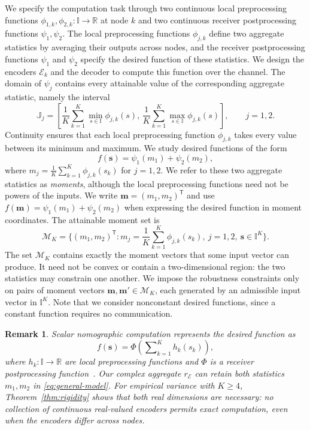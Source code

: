 \documentclass[journal,12pt,onecolumn,draftclsnofoot]{IEEEtran}
\newtheorem{remark}{Remark}
\newcommand{\enc}{\mathscr{E}}\newcommand{\dec}{\mathscr{D}}\newcommand{\R}{\mathbb R}\newcommand{\C}{\mathbb C}
\newcommand{\T}{\mathsf T}\newcommand{\suc}{\succeq}
\begin{document}
We specify the computation task through two continuous local preprocessing functions $\phi_{1,k},\phi_{2,k}:\mathbb I\to\R$ at node $k$ and two continuous receiver postprocessing functions $\psi_1,\psi_2$. The local preprocessing functions $\phi_{j,k}$ define two aggregate statistics by averaging their outputs across nodes, and the receiver postprocessing functions $\psi_1$ and $\psi_2$ specify the desired function of these statistics. We design the encoders $\mathscr E_k$ and the decoder to compute this function over the channel. The domain of $\psi_j$ contains every attainable value of the corresponding aggregate statistic, namely the interval
$$
\mathbb J_j=\left[
\frac1K\sum_{k=1}^K\min_{s\in\mathbb I}\phi_{j,k}(s),\,
\frac1K\sum_{k=1}^K\max_{s\in\mathbb I}\phi_{j,k}(s)
\right],\qquad j=1,2.
$$
Continuity ensures that each local preprocessing function $\phi_{j,k}$ takes every value between its minimum and maximum. We study desired functions of the form
\begin{equation}
 f(\boldsymbol s)=\psi_1(m_1)+\psi_2(m_2),
 \label{eq:general-model}
\end{equation}
where $m_j=\frac1K\sum_{k=1}^K\phi_{j,k}(s_k)$ for $j=1,2$. We refer to these two aggregate statistics as \emph{moments}, although the local preprocessing functions need not be powers of the inputs. We write $\boldsymbol m=(m_1,m_2)^\T$ and use $f(\boldsymbol m)=\psi_1(m_1)+\psi_2(m_2)$ when expressing the desired function in moment coordinates. The attainable moment set is
\begin{equation}
 \mathcal M_K=\bigg\{(m_1,m_2)^\T: m_j=\frac1K\sum_{k=1}^K\phi_{j,k}(s_k),~ j=1,2,~ \boldsymbol s\in\mathbb I^K\bigg\}.
 \label{eq:general-moment-set}
\end{equation}
The set $\mathcal M_K$ contains exactly the moment vectors that some input vector can produce. It need not be convex or contain a two-dimensional region: the two statistics may constrain one another. We impose the robustness constraints only on pairs of moment vectors $\boldsymbol m,\boldsymbol m'\in\mathcal M_K$, each generated by an admissible input vector in $\mathbb I^K$. Note that we consider nonconstant desired functions, since a constant function requires no communication.



   
\begin{remark}
Scalar nomographic computation represents the desired function as
$$
f(\boldsymbol s)=\Phi\!\left(\sum\nolimits_{k=1}^K h_k(s_k)\right),
$$
where $h_k:\mathbb I\to\R$ are local preprocessing functions and $\Phi$ is a receiver postprocessing function~\cite{goldenbaum2015}. Our complex aggregate $r_\enc$ can retain both statistics $m_1,m_2$ in \eqref{eq:general-model}. For empirical variance with $K\ge4$, Theorem~\ref{thm:rigidity} shows that both real dimensions are necessary: no collection of continuous real-valued encoders permits exact computation, even when the encoders differ across nodes.
\end{remark}
\end{document}
